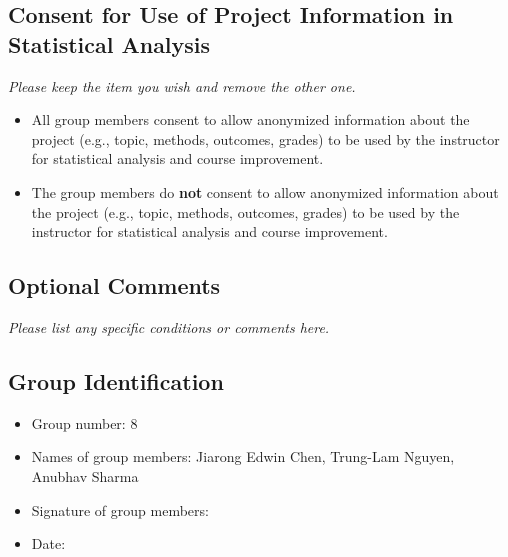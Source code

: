 \documentclass{article}
\begin{document}
\subsection*{Consent for Use of Project Information in Statistical Analysis}
\textit{Please keep the item you wish and remove the other one.}
\begin{itemize}
	\item All group members consent to allow anonymized information about the project (e.g., topic, methods, outcomes, grades) to be used by the instructor for statistical analysis and course improvement.
	\item The group members do \textbf{not} consent to allow anonymized information about the project (e.g., topic, methods, outcomes, grades) to be used by the instructor for statistical analysis and course improvement.
\end{itemize}

\subsection*{Optional Comments}
\textit{Please list any specific conditions or comments here.}

\subsection*{Group Identification}

\begin{itemize}
	\item Group number: 8
	\item Names of group members: Jiarong Edwin Chen, Trung-Lam Nguyen, Anubhav Sharma
	\item Signature of group members:
	\item Date:
\end{itemize}
\end{document}
